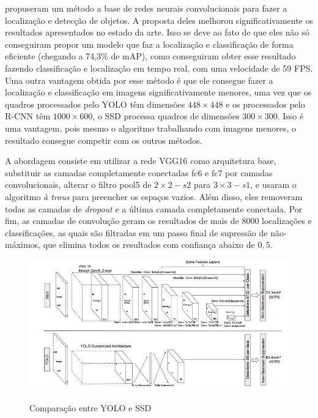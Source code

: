  propuseram um método a base de redes neurais convolucionais para fazer a localização e detecção de objetos. A proposta deles melhorou significativamente os resultados apresentados no estado da arte. Isso se deve ao fato de que eles não só conseguiram propor um modelo que faz a localização e classificação de forma eficiente (chegando a 74,3\% de \ac{mAP}), como conseguiram obter esse resultado fazendo classificação e localização em tempo real, com uma velocidade de 59 \ac{FPS}. Uma outra vantagem obtida por esse método é que ele consegue fazer a localização e classificação em imagens significativamente menores, uma vez que os quadros processados pelo \ac{YOLO} têm dimensões $448 \times 448$ e os processados pelo \ac{R-CNN} têm $1000\times 600$, o \ac{SSD} processa quadros de dimensões $300 \times 300$. Isso é uma vantagem, pois mesmo o algoritmo trabalhando com imagens menores, o resultado consegue competir com os outros métodos.

A abordagem consiste em utilizar a rede VGG16 \cite{simonyan-2014} como arquitetura base, substituir as camadas completamente conectadas fc6 e fc7 por camadas convolucionais, alterar o filtro pool5 de $2 \times 2 - s2$ para $3 \times 3 - s1$, e usaram o algoritmo \textit{à trous}\cite{holschneider-1990} para preencher os espaços vazios. Além disso, eles removeram todas as camadas de \textit{dropout} e a última camada completamente conectada. Por fim, as camadas de convolução geram os resultados de mais de 8000 localizações e classificações, as quais são filtradas em um passo final de supressão de não-máximos, que elimina todos os resultados com confiança abaixo de $0,5$.

  \begin{figure}[H]
	\setlength{\abovecaptionskip}{0pt}
	\setlength{\belowcaptionskip}{0pt}
	\caption[YOLO e SSD]{Comparação entre \ac{YOLO} e \ac{SSD}}
	\centering
	\includegraphics[width=.6\textwidth]{imagem/0x_yoloxssd.JPG}
	\captionsetup{justification=centering}
	\label{fig:yoloxssd}
\end{figure}

